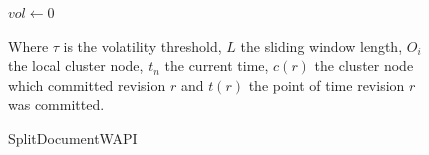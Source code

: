 \documentclass[abstracton,12pt]{scrreprt}
\begin{document}
\begin{figure}[h]
    \begin{algorithm}[H]
        \DontPrintSemicolon
        \begin{footnotesize}
            \label{algo:split_document_wapi}
            \caption{SplitDocumentWAPI}
            $vol \longleftarrow 0$\;
        \end{footnotesize}
    \end{algorithm}
    Where $\tau$ is the volatility threshold, 
    $L$ the sliding window length, 
    $O_i$ the local cluster node, 
    $t_n$ the current time, 
    $c(r)$ the cluster node which committed revision $r$ and 
    $t(r)$ the point of time revision $r$ was committed.
\end{figure}

\begin{figure}[h]
    
\end{figure}
\end{document}
